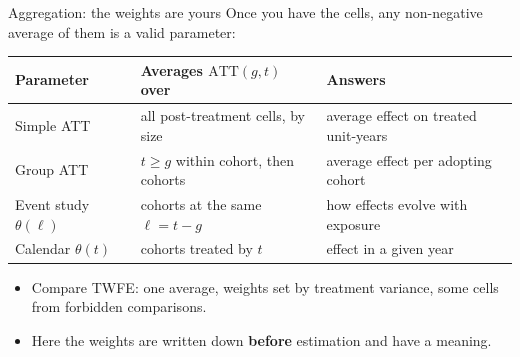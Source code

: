\documentclass[
  11pt,
  ignorenonframetext,
  aspectratio=169,
]{beamer}
\providecommand{\tightlist}{%
  \setlength{\itemsep}{0pt}\setlength{\parskip}{0pt}}
\begin{document}
\begin{frame}{Aggregation: the weights are yours}
\protect{}\label{aggregation-the-weights-are-yours}
Once you have the cells, any non-negative average of them is a valid
parameter:

\begin{center}\small
\begin{tabular}{lll}
\toprule
Parameter & Averages $\text{ATT}(g,t)$ over & Answers \\
\midrule
Simple ATT & all post-treatment cells, by size & average effect on treated unit-years \\
Group ATT & $t \ge g$ within cohort, then cohorts & average effect per adopting cohort \\
Event study $\theta(\ell)$ & cohorts at the same $\ell = t - g$ & how effects evolve with exposure \\
Calendar $\theta(t)$ & cohorts treated by $t$ & effect in a given year \\
\bottomrule
\end{tabular}
\end{center}

\begin{itemize}
\tightlist
\item
  Compare TWFE: one average, weights set by treatment variance, some
  cells from forbidden comparisons.
\item
  Here the weights are written down \textbf{before} estimation and have
  a meaning.
\end{itemize}
\end{frame}
\end{document}
